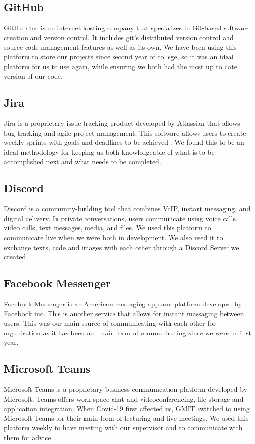 \subsection{GitHub}
GitHub Inc is an internet hosting company that specializes in Git-based software creation and version control. It includes git's distributed version control and source code management features as well as its own.\cite{git}  We have been using this platform to store our projects since second year of college, so it was an ideal platform for us to use again, while ensuring we both had the most up to date version of our code.

\subsection{Jira}
Jira is a proprietary issue tracking product developed by Atlassian that allows bug tracking and agile project management. This software allows users to create weekly sprints with goals and deadlines to be achieved \cite{Jira}. We found this to be an ideal methodology for keeping us both knowledgeable of what is to be accomplished next and what needs to be completed.

\subsection{Discord}
Discord is a community-building tool that combines VoIP, instant messaging, and digital delivery.
In private conversations, users communicate using voice calls, video calls, text messages, media, and files. We used this platform to communicate live when we were both in development. We also used it to exchange texts, code and images with each other through a Discord Server we created.

\subsection{Facebook Messenger}
Facebook Messenger is an American messaging app and platform developed by Facebook inc. This is another service that allows for instant massaging between users. This was our main source of communicating with each other for organisation as it has been our main form of communicating since we were in first year.

\subsection{Microsoft Teams}
Microsoft Teams is a proprietary business communication platform developed by Microsoft. Teams offers work space chat and videoconferencing, file storage and application integration. \cite{teams}When Covid-19 first affected us, GMIT switched to using Microsoft Teams for their main form of lecturing and live meetings. We used this platform weekly to have meeting with our supervisor and to communicate with them for advice.

